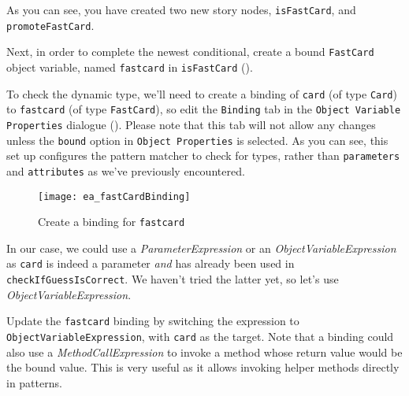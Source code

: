 \begin{stepbystep}
\item As you can see, you have created two new story nodes, \texttt{isFastCard}, and \texttt{promoteFastCard}.
 
\item Next, in order to complete the newest conditional, create a bound \texttt{FastCard} object variable, named \texttt{fastcard} in
\texttt{isFastCard} ().
 
\item To check the dynamic type, we'll need to create a binding of \texttt{card} (of type \texttt{Card}) to \texttt{fastcard} (of
type \texttt{FastCard}), so edit the \texttt{Binding} tab in the \texttt{Object Variable Properties} dialogue (). Please note that
this tab will not allow any changes unless the \texttt{bound} option in \texttt{Object Properties} is selected. As you can see, this set up configures the
pattern matcher to check for types, rather than \texttt{parameters} and \texttt{attributes} as we've previously encountered.

\vspace{0.5cm}

\begin{figure}[htbp]
\begin{center}
  \texttt{[image: ea\_fastCardBinding]}
  \caption{Create a binding for \texttt{fastcard}}  
  \label{ea:fastCardBinding}
\end{center}
\end{figure}

\clearpage

In our case, we could use a \emph{ParameterExpression} or an \emph{ObjectVariableExpression} as \texttt{card} is indeed a
parameter \emph{and} has already been used in \texttt{checkIfGuessIsCorrect}. We haven't tried the latter yet, so let's use \emph{ObjectVariableExpression}.

\item Update the \texttt{fastcard} binding by switching the expression to 
\texttt{Object\-Vari\-able\-Ex\-pres\-sion}, with \texttt{card} as the target. Note that a binding could also use a \emph{MethodCallExpression} to invoke a
method whose return value would be the bound value. This is very useful as it allows invoking helper methods directly in patterns.


\end{stepbystep}
